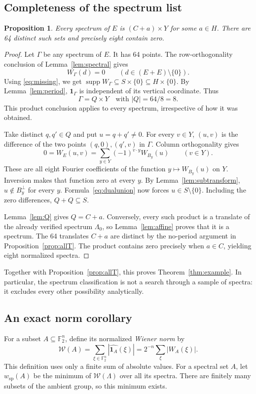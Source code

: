 \documentclass[11pt]{article}
\numberwithin{equation}{section}
\newtheorem{proposition}[theorem]{Proposition}
\theoremstyle{definition}
\theoremstyle{remark}\newtheorem{remark}[theorem]{Remark}
\newcommand{\F}{\mathbb F_2}
\newcommand{\supp}{\operatorname{supp}}
\newcommand{\W}{\mathcal W}
\newcommand{\wsp}{w_{\mathrm{sp}}}
\newcommand{\one}{\mathbf1}
\begin{document}
\subsection{Completeness of the spectrum list}
\begin{proposition}\label{prop:allL}
Every spectrum of $E$ is $(C+a)\times Y$ for some $a\in H$. There are 64 distinct such sets and precisely eight contain zero.
\end{proposition}
\begin{proof}
Let $\Gamma$ be any spectrum of $E$. It has 64 points. The row-orthogonality conclusion of Lemma~\ref{lem:spectral} gives
\[
 W_\Gamma(d)=0\qquad(d\in(E+E)\setminus\{0\}).
\]
Using \eqref{eq:missing}, we get $\supp W_\Gamma\subseteq S\times\{0\}\subseteq H\times\{0\}$. By Lemma~\ref{lem:period}, $\one_\Gamma$ is independent of its vertical coordinate. Thus
\[
 \Gamma=Q\times Y\quad\text{with }|Q|=64/8=8.
\]
This product conclusion applies to every spectrum, irrespective of how it was obtained.

Take distinct $q,q'\in Q$ and put $u=q+q'\ne0$. For every $v\in Y$, $(u,v)$ is the difference of the two points $(q,0),(q',v)$ in $\Gamma$. Column orthogonality gives
\[
 0=W_E(u,v)=\sum_{y\in Y}(-1)^{v\cdot y}W_{B_y}(u)
 \qquad(v\in Y).
\]
These are all eight Fourier coefficients of the function $y\mapsto W_{B_y}(u)$ on $Y$. Inversion makes that function zero at every $y$. By Lemma~\ref{lem:subtransform}, $u\notin B_y^\perp$ for every $y$. Formula~\eqref{eq:dualunion} now forces $u\in S\setminus\{0\}$. Including the zero differences, $Q+Q\subseteq S$.

Lemma~\ref{lem:Q} gives $Q=C+a$. Conversely, every such product is a translate of the already verified spectrum $\Lambda_0$, so Lemma~\ref{lem:affine} proves that it is a spectrum. The 64 translates $C+a$ are distinct by the no-period argument in Proposition~\ref{prop:allT}. The product contains zero precisely when $a\in C$, yielding eight normalized spectra.
\end{proof}
Together with Proposition~\ref{prop:allT}, this proves Theorem~\ref{thm:example}. In particular, the spectrum classification is not a search through a sample of spectra: it excludes every other possibility analytically.

\subsection{An exact norm corollary}
For a subset $A\subseteq\F^n$, define its normalized \emph{Wiener norm} by
\[
 \W(A)=\sum_{\xi\in\F^n}|\widehat{\one_A}(\xi)|
       =2^{-n}\sum_\xi|W_A(\xi)|.
\]
This definition uses only a finite sum of absolute values. For a spectral set $A$, let $\wsp(A)$ be the minimum of $\W(\Lambda)$ over all its spectra. There are finitely many subsets of the ambient group, so this minimum exists.
\end{document}
